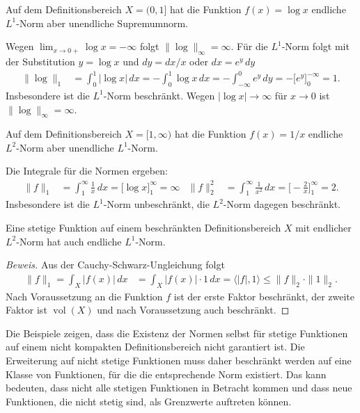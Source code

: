 

\begin{beispiel}
Auf dem Definitionsbereich $X=(0,1]$ hat die Funktion
$f(x)=\log x$ endliche $L^1$-Norm aber unendliche Supremumnorm.

\medskip
\noindent
Wegen $\lim_{x\to 0+}\log x = -\infty$ folgt $\|\log\|_\infty=\infty$.
Für die $L^1$-Norm folgt mit der Substitution $y=\log x$ und
$dy = dx/x$ oder $dx = e^y\,dy$
\begin{align*}
\|\log\|_1
&=
\int_0^1|\log x|\,dx
=
-\int_0^1\log x\,dx
=
-\int_{-\infty}^0 e^y\,dy
=
-\biggl[ e^y \biggr]_0^{-\infty}
=
1.
\end{align*}
Insbesondere ist die $L^1$-Norm beschränkt.
Wegen $|\log x|\to\infty$ für $x\to 0$ ist $\|\log\|_\infty=\infty$.
\end{beispiel}

\begin{beispiel}
Auf dem Definitionsbereich $X=[1,\infty)$ hat die Funktion
$f(x)=1/x$ endliche $L^2$-Norm aber unendliche $L^1$-Norm.

\medskip
\noindent
Die Integrale für die Normen ergeben:
\begin{align*}
\|f\|_1
&=
\int_1^\infty \frac{1}{x}\,dx
=
\biggl[\log x\biggr]_1^\infty
=
\infty
&
\|f\|_2^2
&=
\int_1^\infty \frac{1}{x^2}\,dx
=
\biggl[-\frac{2}{x}\biggr]_1^\infty
=
2.
\end{align*}
Insbesondere ist die $L^1$-Norm unbeschränkt, die $L^2$-Norm dagegen
beschränkt.
\end{beispiel}

\begin{satz}
Eine stetige Funktion auf einem beschränkten Definitionsbereich $X$
mit endlicher $L^2$-Norm hat auch endliche $L^1$-Norm.
\end{satz}

\begin{proof}[Beweis]
Aus der Cauchy-Schwarz-Ungleichung folgt
\begin{align*}
\|f\|_1
=
\int_X |f(x)|\,dx
&=
\int_X |f(x)|\cdot 1 \,dx
=
\langle |f|, 1\rangle
\le
\|f\|_2\cdot \|1\|_2.
\end{align*}
Nach Voraussetzung an die Funktion $f$ ist der erste Faktor beschränkt,
der zweite Faktor ist $\operatorname{vol}(X)$ und nach Voraussetzung
auch beschränkt.
\end{proof}

Die Beispiele zeigen, dass die Existenz der Normen selbst für stetige
Funktionen auf einem nicht kompakten Definitionsbereich nicht garantiert ist.
Die Erweiterung auf nicht stetige Funktionen muss daher beschränkt
werden auf eine Klasse von Funktionen, für die die entsprechende Norm
existiert.
Das kann bedeuten, dass nicht alle stetigen Funktionen in Betracht 
kommen und dass neue Funktionen, die nicht stetig sind, als
Grenzwerte auftreten können.

